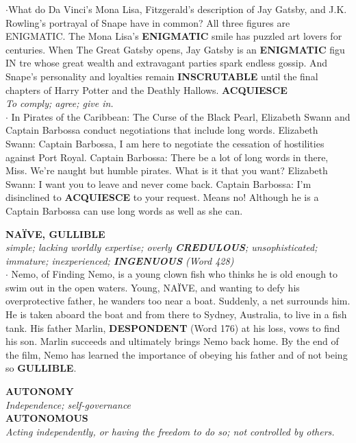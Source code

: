 \documentclass{exam}
\begin{document}
\begin{questions}
$\cdot$What do Da Vinci's Mona Lisa, Fitzgerald's description of Jay Gatsby, and J.K. Rowling's portrayal of Snape have in common? All three figures are ENIGMATIC. The Mona Lisa's \textbf{ENIGMATIC} smile has puzzled art lovers for centuries. When The Great Gatsby opens, Jay Gatsby is an \textbf{ENIGMATIC} figu IN tre whose great wealth and extravagant parties spark endless gossip. And Snape's personality and loyalties remain \textbf{INSCRUTABLE} until the final chapters of Harry Potter and the Deathly Hallows. 
\question \textbf{ACQUIESCE}\\ \textit{To comply; agree; give in.}\\ 

$\cdot$ In Pirates of the Caribbean: The Curse of the Black Pearl, Elizabeth Swann and Captain Barbossa conduct negotiations that include long words. Elizabeth Swann: Captain Barbossa, I am here to negotiate the cessation of hostilities against Port Royal. Captain Barbossa: There be a lot of long words in there, Miss. We're naught but humble pirates. What is it that you want? Elizabeth Swann: I want you to leave and never come back. Captain Barbossa: I'm disinclined to \textbf{ACQUIESCE} to your request. Means no!  Although he is a  Captain Barbossa can use long words as well as she can.

\question \textbf{NAÏVE, GULLIBLE}\\ 
\textit{simple; lacking worldly expertise; overly \textbf{CREDULOUS}; unsophisticated; immature; inexperienced; \textbf{INGENUOUS} (Word 428)}\\  

$\cdot$ Nemo, of Finding Nemo, is a young clown fish who thinks he is old enough to swim out in the open waters. Young, NAÏVE, and wanting to defy his overprotective father, he wanders too near a boat. Suddenly, a net surrounds him. He is taken aboard the boat and from there to Sydney, Australia, to live in a fish tank. His father Marlin, \textbf{DESPONDENT} (Word 176) at his loss, vows to find his son. Marlin succeeds and ultimately brings Nemo back home. By the end of the film, Nemo has learned the importance of obeying his father and of not being so \textbf{GULLIBLE}.

\question \textbf{AUTONOMY}\\ \textit{Independence; self-governance} \\ \textbf{AUTONOMOUS}\\ \textit{Acting independently, or having the freedom to do so; not controlled by others.}\\ 


\end{questions}
\end{document}
